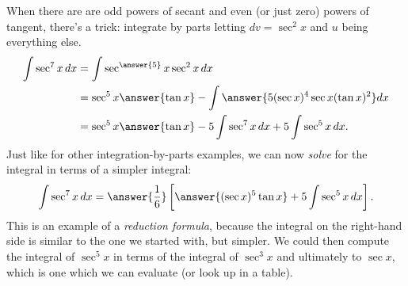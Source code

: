 \documentclass{ximera}
\begin{document}
\begin{example}
When there are are odd powers of secant and even (or just zero) powers of tangent, there's a trick: integrate by parts letting $dv = \sec^2 x$ and $u$ being everything else. \label{trig:reduce_example}
\[ \begin{aligned}
\int \sec^7 x \, dx & = \int \sec^{\answer{5}} x  \sec^2 x \, dx \\
& = \sec^5 x \answer{\tan x} - \int \answer{5 (\sec x)^4 \sec x (\tan x)^2} dx \\
& = \sec^5 x \answer{\tan x} - 5 \int \sec^7 x \, dx + 5 \int \sec^5 x \, dx.
\end{aligned} \]
Just like for other integration-by-parts examples, we can now \textit{solve} for the integral in terms of a simpler integral:
\[ \int \sec^7 x \, dx = \answer{\frac{1}{6}} \left[ \answer{(\sec x)^5 \tan x} + 5 \int \sec^5 x \, dx \right]. \]
This is an example of a \textit{reduction formula}, because the integral on the right-hand side is similar to the one we started with, but simpler. We could then compute the integral of $\sec^5 x$ in terms of the integral of $\sec^3 x$ and ultimately to $\sec x$, which is one which we can evaluate (or look up in a table).
\end{example}
\end{document}
